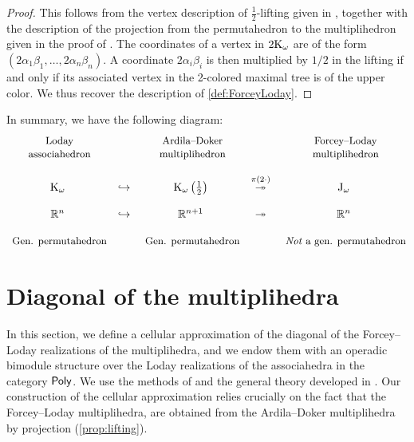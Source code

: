 \documentclass[twoside, 11pt]{amsart}
\theoremstyle{remark}
\begin{document}
\begin{proof} 
  This follows from the vertex description of $\tfrac{1}{2}$-lifting given in \cite[Definition 3.5.3]{Doker11}, together with the description of the projection from the permutahedron to the multiplihedron given in the proof of \cite[Theorem 3.3.6]{Doker11}. 
  The coordinates of a vertex in $2 \mathrm{K}_\omega$ are of the form $(2\alpha_1\beta_1, \ldots, 2\alpha_n\beta_n)$. 
  A coordinate $2\alpha_i\beta_i$ is then multiplied by $1/2$ in the lifting if and only if its associated vertex in the 2-colored maximal tree is of the upper color. 
  We thus recover the description of \cref{def:ForceyLoday}.
\end{proof}

In summary, we have the following diagram:
\medskip
\begin{equation*}
\begin{matrix}
  $ \small  \text{Loday}$ & & $ \small \text{Ardila--Doker}$ &  & $ \small \text{Forcey--Loday}$ \\
  $ \small  \text{associahedron}$ & & $ \small \text{multiplihedron}$ &  & $ \small \text{multiplihedron}$ \\
  & &  &  & \\
  \K_\omega & \hookrightarrow & \K_\omega \left(\tfrac{1}{2}\right) & \overset{\pi ( 2 \cdot ) }{\twoheadrightarrow} & \J_\omega \\
   & &  &  & \\
  \RR^n & \hookrightarrow & \RR^{n+1} & \twoheadrightarrow & \RR^n \\
  & &  &  & \\
  $ \small \text{Gen. permutahedron}$ & & $ \small \text{Gen. permutahedron}$ &  & $ \small \textit{Not}\text{ a gen. permutahedron}$
\end{matrix}
\end{equation*}


\section{Diagonal of the multiplihedra}
\label{sec:II}

In this section, we define a cellular approximation of the diagonal of the Forcey--Loday realizations of the multiplihedra, and we endow them with an operadic bimodule structure over the Loday realizations of the associahedra in the category $\mathsf{Poly}$. 
We use the methods of \cite{MTTV19} and the general theory developed in \cite{LA21}.
Our construction of the cellular approximation relies crucially on the fact that the Forcey--Loday multiplihedra, are obtained from the Ardila--Doker multiplihedra by projection (\cref{prop:lifting}).
\end{document}
